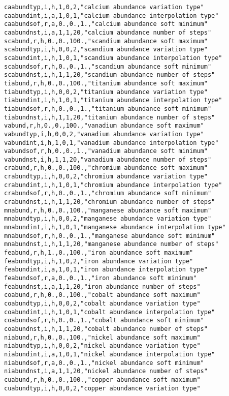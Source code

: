 \begin{verbatim}
caabundtyp,i,h,1,0,2,"calcium abundance variation type"
caabundint,i,a,1,0,1,"calcium abundance interpolation type"
caabundsof,r,a,0.,0.,1.,"calcium abundance soft minimum"
caabundnst,i,a,1,1,20,"calcium abundance number of steps"
scabund,r,h,0.,0.,100.,"scandium abundance soft maximum"
scabundtyp,i,h,0,0,2,"scandium abundance variation type"
scabundint,i,h,1,0,1,"scandium abundance interpolation type"
scabundsof,r,h,0.,0.,1.,"scandium abundance soft minimum"
scabundnst,i,h,1,1,20,"scandium abundance number of steps"
tiabund,r,h,0.,0.,100.,"titanium abundance soft maximum"
tiabundtyp,i,h,0,0,2,"titanium abundance variation type"
tiabundint,i,h,1,0,1,"titanium abundance interpolation type"
tiabundsof,r,h,0.,0.,1.,"titanium abundance soft minimum"
tiabundnst,i,h,1,1,20,"titanium abundance number of steps"
vabund,r,h,0.,0.,100.,"vanadium abundance soft maximum"
vabundtyp,i,h,0,0,2,"vanadium abundance variation type"
vabundint,i,h,1,0,1,"vanadium abundance interpolation type"
vabundsof,r,h,0.,0.,1.,"vanadium abundance soft minimum"
vabundnst,i,h,1,1,20,"vanadium abundance number of steps"
crabund,r,h,0.,0.,100.,"chromium abundance soft maximum"
crabundtyp,i,h,0,0,2,"chromium abundance variation type"
crabundint,i,h,1,0,1,"chromium abundance interpolation type"
crabundsof,r,h,0.,0.,1.,"chromium abundance soft minimum"
crabundnst,i,h,1,1,20,"chromium abundance number of steps"
mnabund,r,h,0.,0.,100.,"manganese abundance soft maximum"
mnabundtyp,i,h,0,0,2,"manganese abundance variation type"
mnabundint,i,h,1,0,1,"manganese abundance interpolation type"
mnabundsof,r,h,0.,0.,1.,"manganese abundance soft minimum"
mnabundnst,i,h,1,1,20,"manganese abundance number of steps"
feabund,r,h,1.,0.,100.,"iron abundance soft maximum"
feabundtyp,i,h,1,0,2,"iron abundance variation type"
feabundint,i,a,1,0,1,"iron abundance interpolation type"
feabundsof,r,a,0.,0.,1.,"iron abundance soft minimum"
feabundnst,i,a,1,1,20,"iron abundance number of steps"
coabund,r,h,0.,0.,100.,"cobalt abundance soft maximum"
coabundtyp,i,h,0,0,2,"cobalt abundance variation type"
coabundint,i,h,1,0,1,"cobalt abundance interpolation type"
coabundsof,r,h,0.,0.,1.,"cobalt abundance soft minimum"
coabundnst,i,h,1,1,20,"cobalt abundance number of steps"
niabund,r,h,0.,0.,100.,"nickel abundance soft maximum"
niabundtyp,i,h,0,0,2,"nickel abundance variation type"
niabundint,i,a,1,0,1,"nickel abundance interpolation type"
niabundsof,r,a,0.,0.,1.,"nickel abundance soft minimum"
niabundnst,i,a,1,1,20,"nickel abundance number of steps"
cuabund,r,h,0.,0.,100.,"copper abundance soft maximum"
cuabundtyp,i,h,0,0,2,"copper abundance variation type"

\end{verbatim}
